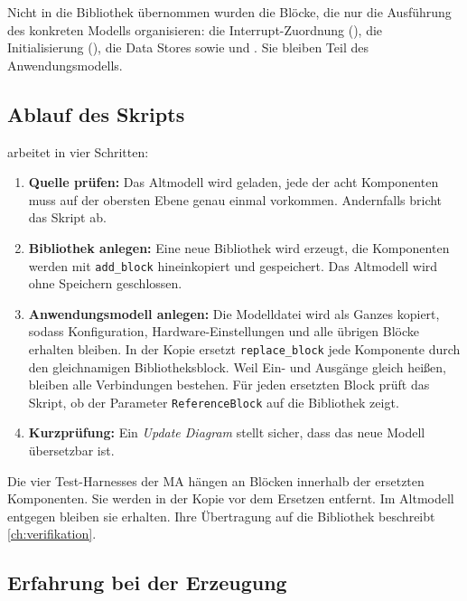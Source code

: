 Nicht in die Bibliothek übernommen wurden die Blöcke, die nur die Ausführung des konkreten
Modells organisieren: die Interrupt-Zuordnung (), die Initialisierung
(), die Data Stores sowie  und
. Sie bleiben Teil des Anwendungsmodells.

\subsection{Ablauf des Skripts}

 arbeitet in vier Schritten:

\begin{enumerate}
  \item \textbf{Quelle prüfen:} Das Altmodell wird geladen, jede der acht Komponenten muss
    auf der obersten Ebene genau einmal vorkommen. Andernfalls bricht das Skript ab.
  \item \textbf{Bibliothek anlegen:} Eine neue Bibliothek wird erzeugt, die Komponenten
    werden mit \texttt{add\_block} hineinkopiert und gespeichert. Das Altmodell wird ohne
    Speichern geschlossen.
  \item \textbf{Anwendungsmodell anlegen:} Die Modelldatei wird als Ganzes kopiert, sodass
    Konfiguration, Hardware-Einstellungen und alle übrigen Blöcke erhalten bleiben. In der
    Kopie ersetzt \texttt{replace\_block} jede Komponente durch den gleichnamigen
    Bibliotheksblock. Weil Ein- und Ausgänge gleich heißen, bleiben alle Verbindungen
    bestehen. Für jeden ersetzten Block prüft das Skript, ob der Parameter
    \texttt{ReferenceBlock} auf die Bibliothek zeigt.
  \item \textbf{Kurzprüfung:} Ein \emph{Update Diagram} stellt sicher, dass das neue Modell
    übersetzbar ist.
\end{enumerate}

Die vier Test-Harnesses der \ac{MA} hängen an Blöcken innerhalb der ersetzten Komponenten.
Sie werden in der Kopie vor dem Ersetzen entfernt. Im Altmodell entgegen bleiben sie erhalten. Ihre
Übertragung auf die Bibliothek beschreibt \cref{ch:verifikation}.

\subsection{Erfahrung bei der Erzeugung}

